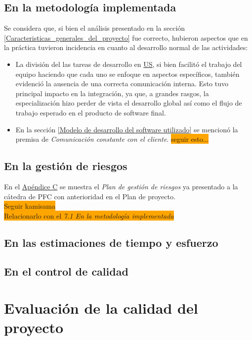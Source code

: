 \documentclass[a4paper, 12pt,twoside]{report}  %
\numberwithin{equation}{subsection} %
\begin{document}
\section{En la metodología implementada}
Se considera que, si bien el análisis presentado en la sección \ref{Caracteristicas_generales_del_proyecto} fue correcto, hubieron aspectos que en la práctica tuvieron incidencia en cuanto al desarrollo normal de las actividades:
\begin{itemize}
	\item La división del las tareas de desarrollo en \hyperlink{US}{US}, si bien facilitó el trabajo del equipo haciendo que cada uno se enfoque en aspectos específicos, también evidenció la ausencia de una correcta comunicación interna. Esto tuvo principal impacto en la integración, ya que, a grandes rasgos, la especialización hizo perder de vista el desarrollo global así como el flujo de trabajo esperado en el producto de software final.
	\item En la sección \ref{Modelo de desarrollo del software utilizado} se mencionó la premisa de \textit{Comunicación constante con el cliente}. \colorbox{orange}{seguir esto...}
\end{itemize}

\section{En la gestión de riesgos}
En el \hyperlink{apendice_c}{Apéndice C} se muestra el \textit{Plan de gestión de riesgos} ya presentado a la cátedra de PFC con anterioridad en el Plan de proyecto.\\
\colorbox{orange}{Seguir kamisama}\\
\colorbox{orange}{Relacionarlo con el \textit{7.1 En la metodología implementada}}

\section{En las estimaciones de tiempo y esfuerzo}

\section{En el control de calidad}

\chapter{Evaluación de la calidad del proyecto}
\end{document}
